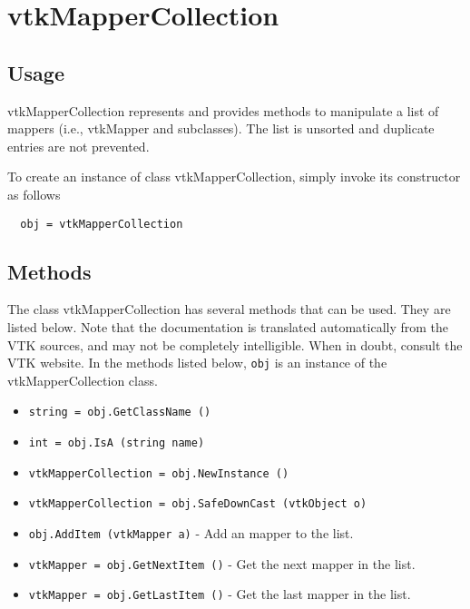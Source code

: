 \section{vtkMapperCollection}

\subsection{Usage}

 vtkMapperCollection represents and provides methods to manipulate a list of
 mappers (i.e., vtkMapper and subclasses). The list is unsorted and duplicate
 entries are not prevented.

To create an instance of class vtkMapperCollection, simply
invoke its constructor as follows
\begin{verbatim}
  obj = vtkMapperCollection
\end{verbatim}
\subsection{Methods}

The class vtkMapperCollection has several methods that can be used.
  They are listed below.
Note that the documentation is translated automatically from the VTK sources,
and may not be completely intelligible.  When in doubt, consult the VTK website.
In the methods listed below, \verb|obj| is an instance of the vtkMapperCollection class.
\begin{itemize}
\item  \verb|string = obj.GetClassName ()|

\item  \verb|int = obj.IsA (string name)|

\item  \verb|vtkMapperCollection = obj.NewInstance ()|

\item  \verb|vtkMapperCollection = obj.SafeDownCast (vtkObject o)|

\item  \verb|obj.AddItem (vtkMapper a)| -  Add an mapper to the list.

\item  \verb|vtkMapper = obj.GetNextItem ()| -  Get the next mapper in the list.

\item  \verb|vtkMapper = obj.GetLastItem ()| -  Get the last mapper in the list.

\end{itemize}
